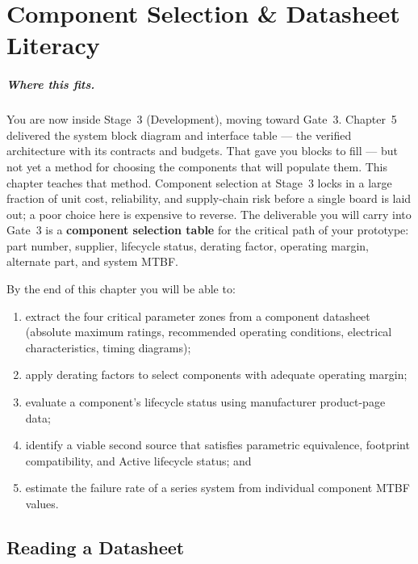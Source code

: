 
\chapter{Component Selection \& Datasheet Literacy}
\label{ch6}

\paragraph{Where this fits.}
You are now inside Stage~3 (Development), moving toward Gate~3.
Chapter~5 delivered the system block diagram and interface table --- the verified architecture with its contracts and budgets.
That gave you blocks to fill --- but not yet a method for choosing the components that will populate them.
This chapter teaches that method.
Component selection at Stage~3 locks in a large fraction of unit cost, reliability, and supply-chain risk before a single board is laid out; a poor choice here is expensive to reverse.
The deliverable you will carry into Gate~3 is a \textbf{component selection table} for the critical path of your prototype: part number, supplier, lifecycle status, derating factor, operating margin, alternate part, and system MTBF.

By the end of this chapter you will be able to:
\begin{enumerate}
  \item extract the four critical parameter zones from a component datasheet (absolute maximum ratings, recommended operating conditions, electrical characteristics, timing diagrams);
  \item apply derating factors to select components with adequate operating margin;
  \item evaluate a component's lifecycle status using manufacturer product-page data;
  \item identify a viable second source that satisfies parametric equivalence, footprint compatibility, and Active lifecycle status; and
  \item estimate the failure rate of a series system from individual component MTBF values.
\end{enumerate}

\section{Reading a Datasheet}
\label{sec:ch6-datasheet}

